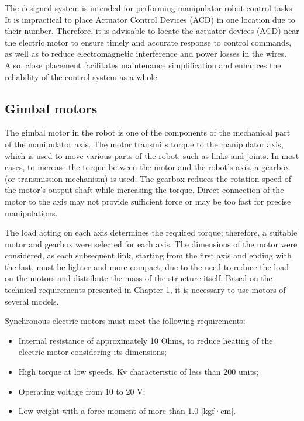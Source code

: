 The designed system is intended for performing manipulator robot control tasks. It is impractical to place Actuator Control Devices (ACD) in one location due to their number. Therefore, it is advisable to locate the actuator devices (ACD) near the electric motor to ensure timely and accurate response to control commands, as well as to reduce electromagnetic interference and power losses in the wires. Also, close placement facilitates maintenance simplification and enhances the reliability of the control system as a whole.

\subsection{Gimbal motors}
The gimbal motor in the robot is one of the components of the mechanical part of the manipulator axis. The motor transmits torque to the manipulator axis, which is used to move various parts of the robot, such as links and joints. In most cases, to increase the torque between the motor and the robot's axis, a gearbox (or transmission mechanism) is used. The gearbox reduces the rotation speed of the motor's output shaft while increasing the torque. Direct connection of the motor to the axis may not provide sufficient force or may be too fast for precise manipulations.

The load acting on each axis determines the required torque; therefore, a suitable motor and gearbox were selected for each axis. The dimensions of the motor were considered, as each subsequent link, starting from the first axis and ending with the last, must be lighter and more compact, due to the need to reduce the load on the motors and distribute the mass of the structure itself. Based on the technical requirements presented in Chapter 1, it is necessary to use motors of several models.

Synchronous electric motors must meet the following requirements:

\begin{itemize}
	\item Internal resistance of approximately 10 Ohms, to reduce heating of the electric motor considering its dimensions;
	\item High torque at low speeds, Kv characteristic of less than 200 units;
	\item Operating voltage from 10 to 20 V;
	\item Low weight with a force moment of more than 1.0 [kgf·cm].
\end{itemize}

